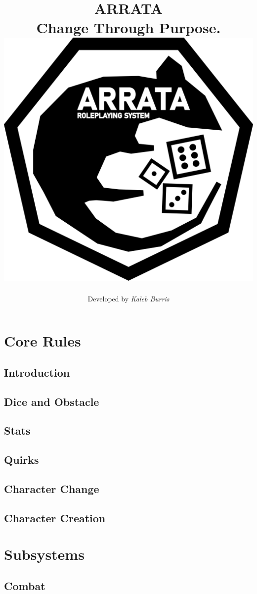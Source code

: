 \documentclass[oneside]{book}
\title{
    \textbf{ARRATA} 
    \\
    \large Change Through Purpose.
    \\
    \includegraphics[width=\textwidth]{rat.png}
}
\date{}
\author{Developed by {\em Kaleb Burris}}
\begin{document}
    \maketitle

    \let\cleardoublepage\clearpage
    \setlength{\headheight}{1.8cm}
    \addtolength{\topmargin}{-2cm}

    \tableofcontents

    \part{Core Rules}

    \chapter{Introduction}
    

    \chapter{Dice and Obstacle}

    \chapter{Stats}

    \chapter{Quirks}

    \chapter{Character Change}

    \chapter{Character Creation}

    \part{Subsystems}

    \chapter{Combat}
\end{document}
